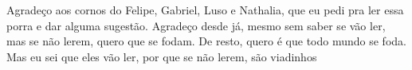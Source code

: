 \begin{agradecimentos}
Agradeço aos cornos do Felipe, Gabriel, Luso e Nathalia, que eu pedi pra ler essa porra e dar alguma sugestão. Agradeço desde já, mesmo sem saber se vão ler, mas se não lerem, quero que se fodam. 
De resto, quero é que todo mundo se foda. Mas eu sei que eles vão ler, por que se não lerem, são viadinhos
\end{agradecimentos}
